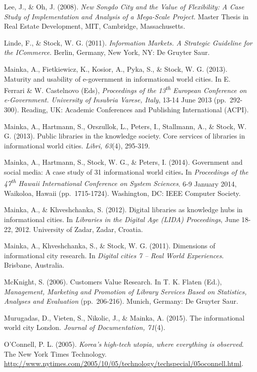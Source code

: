 \documentclass[a4paper,
fontsize=11pt,
oneside,
numbers=noperiodatend,
parskip=half-,
bibliography=totoc,
final
]{scrartcl}
\begin{document}
Lee, J., \& Oh, J. (2008). \emph{New Songdo City and the Value of
Flexibility: A Case Study of Implementation and Analysis of a Mega-Scale
Project.} Master Thesis in Real Estate Development, MIT, Cambridge,
Massachusetts.

Linde, F., \& Stock, W. G. (2011). \emph{Information Markets. A
Strategic Guideline for the ICommerce}. Berlin, Germany, New York, NY:
De Gruyter Saur.

Mainka, A., Fietkiewicz, K., Kosior, A., Pyka, S., \& Stock, W. G.
(2013). Maturity and usability of e-government in informational world
cities. In E. Ferrari \& W. Castelnovo (Eds), \emph{Proceedings of the
13\textsuperscript{th} European Conference on e-Government. University
of Insubria Varese, Italy}, 13-14 June 2013 (pp.~292-300). Reading, UK:
Academic Conferences and Publishing International (ACPI).

Mainka, A., Hartmann, S., Orszullok, L., Peters, I., Stallmann, A., \&
Stock, W. G. (2013). Public libraries in the knowledge society. Core
services of libraries in informational world cities. \emph{Libri,
63}(4), 295-319.

Mainka, A., Hartmann, S., Stock, W. G., \& Peters, I. (2014). Government
and social media: A case study of 31 informational world
cities\textbf{.} In \emph{Proceedings of the 47\textsuperscript{th}
Hawaii International Conference on System Sciences}. 6-9 January 2014,
Waikoloa, Hawaii (pp.~1715-1724). Washington, DC: IEEE Computer Society.

Mainka, A., \& Khveshchanka, S. (2012). Digital libraries as knowledge
hubs in informational cities. In \emph{Libraries in the Digital Age
(LIDA) Proceedings}, June 18-22, 2012. University of Zadar, Zadar,
Croatia.

Mainka, A., Khveshchanka, S., \& Stock, W. G. (2011). Dimensions of
informational city research. In \emph{Digital cities 7 -- Real World
Experiences}. Brisbane, Australia.

McKnight, S. (2006). Customers Value Research. In T. K. Flaten (Ed.),
\emph{Management, Marketing and Promotion of Library Services Based on
Statistics, Analyses and Evaluation} (pp.~206-216). Munich, Germany: De
Gruyter Saur.

Murugadas, D., Vieten, S., Nikolic, J., \& Mainka, A. (2015). The
informational world city London. \emph{Journal of Documentation, 71}(4).

O'Connell, P. L. (2005). \emph{Korea's high-tech utopia, where
everything is observed}. The New York Times Technology.
\url{http://www.nytimes.com/2005/10/05/technology/techspecial/05oconnell.html}.
\end{document}
